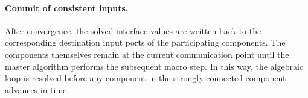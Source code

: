\paragraph{Commit of consistent inputs.}
After convergence, the solved interface values are written back to the corresponding destination input ports of the participating components.
The components themselves remain at the current communication point until the master algorithm performs the subsequent macro step.
In this way, the algebraic loop is resolved before any component in the strongly connected component advances in time.
